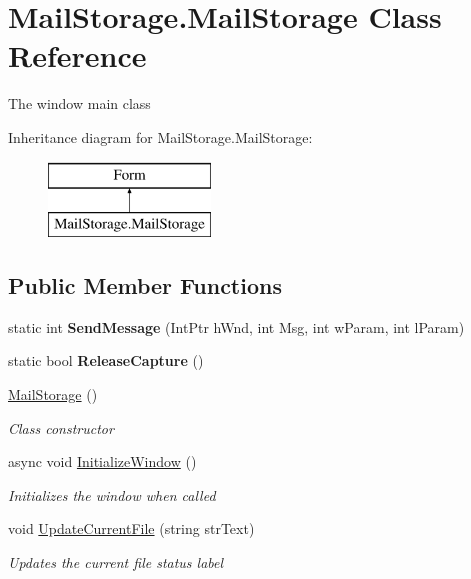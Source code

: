 \hypertarget{class_mail_storage_1_1_mail_storage}{}\section{Mail\+Storage.\+Mail\+Storage Class Reference}
\label{class_mail_storage_1_1_mail_storage}


The window main class  


Inheritance diagram for Mail\+Storage.\+Mail\+Storage\+:\begin{figure}[H]
\begin{center}
\leavevmode
\includegraphics[height=2.000000cm]{class_mail_storage_1_1_mail_storage}
\end{center}
\end{figure}
\subsection*{Public Member Functions}
\begin{DoxyCompactItemize}
\item 
\mbox{\label{class_mail_storage_1_1_mail_storage_a57cf4c19f36b8c6cba262eb476ef5a08}} 
static int {\bfseries Send\+Message} (Int\+Ptr h\+Wnd, int Msg, int w\+Param, int l\+Param)
\item 
\mbox{\label{class_mail_storage_1_1_mail_storage_a7a15caac592591ca913d6fb12cf58488}} 
static bool {\bfseries Release\+Capture} ()
\item 
\hyperlink{class_mail_storage_1_1_mail_storage_aa83a233c9413b11ed949ade4a1ed6a23}{Mail\+Storage} ()
\begin{DoxyCompactList}\small\item\em Class constructor \end{DoxyCompactList}\item 
async void \hyperlink{class_mail_storage_1_1_mail_storage_a3be6ac5a1a821602bd40289b48ef34cb}{Initialize\+Window} ()
\begin{DoxyCompactList}\small\item\em Initializes the window when called \end{DoxyCompactList}\item 
void \hyperlink{class_mail_storage_1_1_mail_storage_a6786eea13365af4431e55937b52b8e22}{Update\+Current\+File} (string str\+Text)
\begin{DoxyCompactList}\small\item\em Updates the current file status label \end{DoxyCompactList}\end{DoxyCompactItemize}
